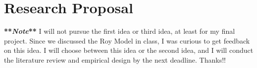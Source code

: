 \documentclass[17pt]{extarticle}  %
\begin{document}
\newcommand{\zz}{\mathbx Z}   %
\newcommand{\qq}{\mathbx Q}   %
\newcommand{\ff}{\mathbx F}   %
\newcommand{\rr}{\mathbx R}   %
\newcommand{\nn}{\mathbx N}   %
\newcommand{\cc}{\mathbx C}   %
\newcommand{\dd}{\mathsf D}   
\newcommand{\id}{\operatorname{id}} %
\newcommand{\im}{\operatorname{im}} %
\newcommand{\dom}{\operatorname{dom}} %
\newcommand{\abs}[1]{\left\lvert#1\right\rvert} %
\newcommand{\norm}[1]{\left\lVert#1\right\rVert} %
\newcommand{\modar}[1]{\operatorname{mod}{#1}} %
\newcommand{\set}[1]{\left\{#1\right\}} %
\newcommand{\setp}[2]{\left\{#1\ :\ #2\right\}} %
\newcommand{\lag}{\mathcal{L}}

\renewcommand\thepage{}

\renewcommand{\epsilon}{\varepsilon}
\renewcommand{\phi}{\varphi}
\renewcommand{\emptyset}{\varnothing}
\renewcommand{\geq}{\geqslant}
\renewcommand{\leq}{\leqslant}
\renewcommand{\Re}{\operatorname{Re}}
\renewcommand{\Im}{\operatorname{Im}}


\theoremstyle{theorem}
\newtheorem{theorem}{Theorem}
\theoremstyle{proposition}
\newtheorem{proposition}{Proposition}
\theoremstyle{definition}
\newtheorem{definition}{Definition}
\theoremstyle{lemma}
\newtheorem{lemma}[theorem]{Lemma}
\theoremstyle{corollary}
\newtheorem{corollary}[theorem]{Corollary}
\theoremstyle{example}
\newtheorem{example}[theorem]{Example}
\theoremstyle{remark}
\newtheorem{remark}[theorem]{Remark}
\theoremstyle{conclusion}
\newtheorem{conclusion}[theorem]{Conclusion}



\section{Research Proposal}

\noindent\textbf{**\emph{Note}**}
I will not pursue the first idea or third idea, at least for my final project. Since we discussed the Roy Model in class, I was curious to get feedback on this idea. I will choose between this idea or the second idea, and I will conduct the literature review and empirical design by the next deadline. Thanks!!
\end{document}

